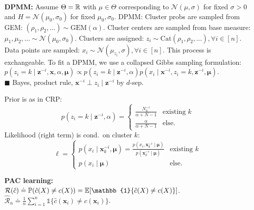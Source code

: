 \documentclass[9pt]{extarticle}
\newenvironment{topic}[1]
{\textbf{\sffamily \colorbox{black}{\rlap{\textbf{\textcolor{white}{#1}}}\hspace{\linewidth}\hspace{-2\fboxsep}}}}
{}
\newenvironment{subtopic}[1]
{\textbf{\sffamily #1:}}
{}
\renewcommand{\vec}[1]{\ensuremath{\mathbold{#1}}}
\begin{document}
\begin{multicols*}{3}
\begin{topic}{Non-parametric Bayesian methods}
        \begin{subtopic}{DPMM}
            Assume $\Theta = \mathbb{R}$ with $\mu \in \Theta$ corresponding to $\mathcal{N}(\mu, \sigma)$ for fixed
            $\sigma > 0$ and $H = \mathcal{N}(\mu_0, \sigma_0)$ for fixed $\mu_0,\sigma_0$. DPMM: Cluster probs
            are sampled from GEM: $(\rho_1, \rho_2, \ldots) \sim \mathrm{GEM}(\alpha)$. Cluster centers are
            sampled from base measure: $\mu_1, \mu_2, \ldots \sim \mathcal{N}(\mu_0, \sigma_0)$. Clusters are
            assigned: $z_i \sim \mathrm{Cat}(\rho_1, \rho_2, \ldots), \forall i \in [n]$. Data points are
            sampled: $x_i \sim \mathcal{N}(\mu_{z_i}, \sigma), \forall i \in [n]$. This process is
            exchangeable. To fit a DPMM, we use a collapsed Gibbs sampling formulation: $p(z_i = k \mid
                \vec{z}^{-i}, \vec{x}, \alpha, \vec{\mu}) \propto p(z_i = k \mid \vec{z}^{-i}, \alpha) p(x_i \mid
                \vec{x}^{-i}, z_i=k, \vec{z}^{-i}, \vec{\mu})$. \\
            $\blacksquare$ Bayes, product rule, $\vec{x}^{-i} \perp z_i \mid \vec{z}^{-i}$ by $d$-sep.

            Prior is as in CRP: \[
                p(z_i = k \mid \vec{z}^{-i}, \alpha) = \begin{cases}
                    \frac{N_k^{-i}}{\alpha+N-1} & \text{existing $k$} \\
                    \frac{\alpha}{\alpha+N-1}   & \text{else}.
                \end{cases}
            \]
            Likelihood (right term) is cond.\ on cluster $k$: \[
                \ell = \begin{cases}
                    p(x_i \mid \vec{x}_k^{-i}, \vec{\mu}) = \frac{p(x_i, \vec{x}_k^{-i} \mid \vec{\mu})}{p(\vec{x}_k^{-i} \mid \vec{\mu})} & \text{existing $k$} \\
                    p(x_i \mid \vec{\mu})                                                                                                  & \text{else}.
                \end{cases}
            \]

        \end{subtopic}

    \end{topic}

    \begin{topic}{Statistical learning theory}

        \begin{subtopic}{PAC learning}
            \\ $\mathcal{R}(\hat{c}) \doteq \mathbb{P}(\hat{c}(X) \neq c(X)) = \E[\mathbb{1}\{ \hat{c}(X) \neq c(X) \}]$.
            \\ $\hat{\mathcal{R}}_n \doteq \frac{1}{n} \sum_{i=1}^{n} \mathbb{1}\{ \hat{c}(\vec{x}_i) \neq c(\vec{x}_i) \}$.


\end{subtopic}
\end{topic}
\end{multicols*}
\end{document}
